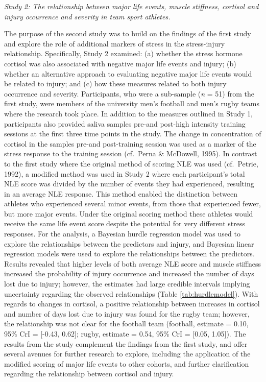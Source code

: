 \documentclass[man,floatsintext]{apa6}
\begin{document}
\emph{Study 2: The relationship between major life events, muscle stiffness, cortisol and injury occurrence and severity in team sport athletes. }

The purpose of the second study was to build on the findings of the first study and explore the role of additional markers of stress in the stress-injury relationship.
Specifically, Study 2 examined:
(a) whether the stress hormone cortisol was also associated with negative major life events and injury;
(b) whether an alternative approach to evaluating negative major life events would be related to injury; and
(c) how these measures related to both injury occurrence and severity.
Participants, who were a sub-sample (\emph{n} = 51) from the first study, were members of the university men's football and men's rugby teams where the research took place.
In addition to the measures outlined in Study 1, participants also provided saliva samples pre-and post-high intensity training sessions at the first three time points in the study.
The change in concentration of cortisol in the samples pre-and post-training session was used as a marker of the stress response to the training session (cf.~Perna \& McDowell, 1995).
In contrast to the first study where the original method of scoring NLE was used (cf.~Petrie, 1992), a modified method was used in Study 2 where each participant's total NLE score was divided by the number of events they had experienced, resulting in an average NLE response.
This method enabled the distinction between athletes who experienced several minor events, from those that experienced fewer, but more major events.
Under the original scoring method these athletes would receive the same life event score despite the potential for very different stress responses.
For the analysis, a Bayesian hurdle regression model was used to explore the relationships between the predictors and injury, and Bayesian linear regression models were used to explore the relationships between the predictors.
Results revealed that higher levels of both average NLE score and muscle stiffness increased the probability of injury occurrence and increased the number of days lost due to injury; however, the estimates had large credible intervals implying uncertainty regarding the observed relationships (Table \ref{tab:hurdlemodel}).
With regards to changes in cortisol, a positive relationship between increases in cortisol and number of days lost due to injury was found for the rugby team; however, the relationship was not clear for the football team (football, estimate = 0.10, 95\% CrI = {[}-0.43, 0.62{]}; rugby, estimate = 0.54, 95\% CrI = {[}0.05, 1.05{]}).
The results from the study complement the findings from the first study, and offer several avenues for further research to explore, including the application of the modified scoring of major life events to other cohorts, and further clarification regarding the relationship between cortisol and injury.
\end{document}
